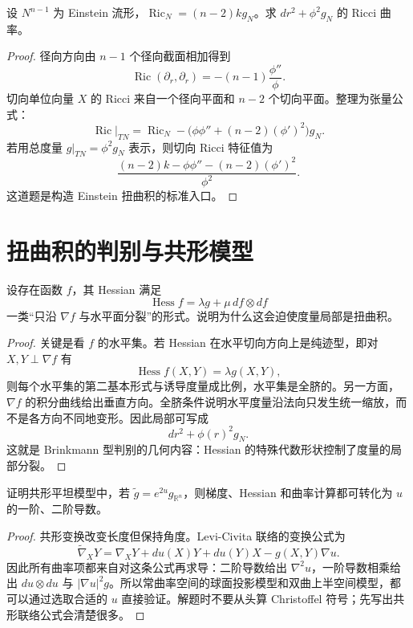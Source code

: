 \documentclass[11pt,a4paper,openany]{ctexbook}
\numberwithin{equation}{chapter}
\begin{document}
\begin{problem}
设 \(N^{n-1}\) 为 Einstein 流形，\(\operatorname{Ric}_N=(n-2)kg_N\)。求 \(dr^2+\phi^2g_N\) 的 Ricci 曲率。
\end{problem}
\begin{proof}
径向方向由 \(n-1\) 个径向截面相加得到
\[
\operatorname{Ric}(\partial_r,\partial_r)=-(n-1)\frac{\phi''}{\phi}.
\]
切向单位向量 \(X\) 的 Ricci 来自一个径向平面和 \(n-2\) 个切向平面。整理为张量公式：
\[
\operatorname{Ric}|_{TN}
=\operatorname{Ric}_N-\bigl(\phi\phi''+(n-2)(\phi')^2\bigr)g_N.
\]
若用总度量 \(g|_{TN}=\phi^2g_N\) 表示，则切向 Ricci 特征值为
\[
\frac{(n-2)k-\phi\phi''-(n-2)(\phi')^2}{\phi^2}.
\]
这道题是构造 Einstein 扭曲积的标准入口。
\end{proof}

\section{扭曲积的判别与共形模型}

\begin{problem}
设存在函数 \(f\)，其 Hessian 满足
\[
\operatorname{Hess}f=\lambda g+\mu\,df\otimes df
\]
一类“只沿 \(\nabla f\) 与水平面分裂”的形式。说明为什么这会迫使度量局部是扭曲积。
\end{problem}
\begin{proof}
关键是看 \(f\) 的水平集。若 Hessian 在水平切向方向上是纯迹型，即对 \(X,Y\perp\nabla f\) 有
\[
\operatorname{Hess}f(X,Y)=\lambda g(X,Y),
\]
则每个水平集的第二基本形式与诱导度量成比例，水平集是全脐的。另一方面，\(\nabla f\) 的积分曲线给出垂直方向。全脐条件说明水平度量沿法向只发生统一缩放，而不是各方向不同地变形。因此局部可写成
\[
dr^2+\phi(r)^2g_N.
\]
这就是 Brinkmann 型判别的几何内容：Hessian 的特殊代数形状控制了度量的局部分裂。
\end{proof}

\begin{problem}
证明共形平坦模型中，若 \(\tilde g=e^{2u}g_{\mathbb R^n}\)，则梯度、Hessian 和曲率计算都可转化为 \(u\) 的一阶、二阶导数。
\end{problem}
\begin{proof}
共形变换改变长度但保持角度。Levi-Civita 联络的变换公式为
\[
\tilde\nabla_XY=\nabla_XY+du(X)Y+du(Y)X-g(X,Y)\nabla u.
\]
因此所有曲率项都来自对这条公式再求导：二阶导数给出 \(\nabla^2u\)，一阶导数相乘给出 \(du\otimes du\) 与 \(|\nabla u|^2g\)。所以常曲率空间的球面投影模型和双曲上半空间模型，都可以通过选取合适的 \(u\) 直接验证。解题时不要从头算 Christoffel 符号；先写出共形联络公式会清楚很多。
\end{proof}
\end{document}
